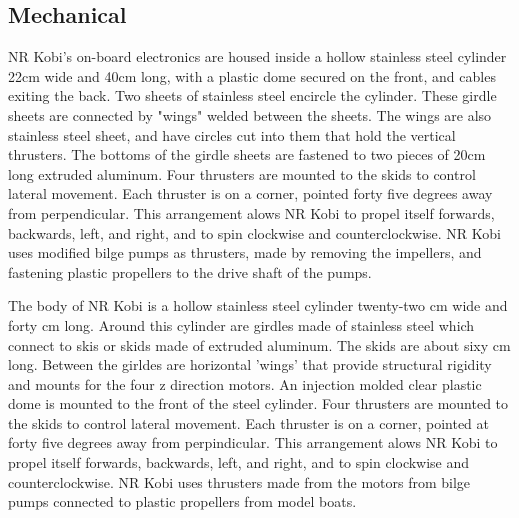 \documentclass{proposalnsf}
\begin{document}
\subsection{Mechanical}
NR Kobi's on-board electronics are housed inside a hollow stainless steel
cylinder 22cm wide and 40cm long, with a plastic dome secured on the front,
and cables exiting the back. Two sheets of stainless steel encircle
the cylinder. These girdle sheets are connected by "wings" welded between
the sheets. The wings are also stainless steel sheet, and have circles cut
into them that hold the vertical thrusters. The bottoms of the girdle
sheets are fastened to two pieces of 20cm long extruded aluminum.
Four thrusters are mounted to the skids to control lateral movement.
Each thruster is on a corner, pointed forty five degrees away from
perpendicular.
This arrangement alows NR Kobi to propel itself forwards, backwards,
left, and right, and to spin clockwise and counterclockwise. NR Kobi
uses modified bilge pumps as thrusters, made by removing the impellers,
and fastening plastic propellers to the drive shaft of the pumps.

The body of NR Kobi is a hollow stainless steel cylinder twenty-two cm  wide and forty cm long. Around this cylinder are girdles made of stainless steel which connect to skis or skids made of extruded aluminum. The skids are about sixy cm long. Between the girldes are horizontal 'wings' that provide structural rigidity and mounts for the four z direction motors. An injection molded clear plastic dome is mounted to the front of the steel cylinder. Four thrusters are mounted to the skids to control lateral movement. Each thruster is on a corner, pointed at forty five degrees away from perpindicular. This arrangement alows NR Kobi to propel itself forwards, backwards, left, and right, and to spin clockwise and counterclockwise. NR Kobi uses thrusters made from the motors from bilge pumps connected to plastic propellers from model boats.
\end{document}
